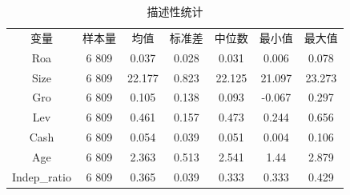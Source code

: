 \documentclass{beamer}	%
\theoremstyle{plain}
\theoremstyle{definition}
\theoremstyle{remark}
\numberwithin{equation}{section}
\begin{document}
\begin{frame}
\setcounter{table}{2}
\begin{table}[htbp]\small
	\centering
	\caption{描述性统计}
	\begin{tabular}{ccccccc}
		\toprule
		\multicolumn{1}{c}{变量} & 样本量   & 均值    & 标准差   & 中位数   & 最小值   & 最大值 \\
		Roa   & 6 809 & 0.037 & 0.028 & 0.031 & 0.006 & 0.078 \\
		Size  & 6 809 & 22.177 & 0.823 & 22.125 & 21.097 & 23.273 \\
		Gro   & 6 809 & 0.105 & 0.138 & 0.093 & -0.067 & 0.297 \\
		Lev   & 6 809 & 0.461 & 0.157 & 0.473 & 0.244 & 0.656 \\
		Cash  & 6 809 & 0.054 & 0.039 & 0.051 & 0.004 & 0.106 \\
		Age   & 6 809 & 2.363 & 0.513 & 2.541 & 1.44  & 2.879 \\
		Indep\_ratio & 6 809 & 0.365 & 0.039 & 0.333 & 0.333 & 0.429 \\
		\bottomrule    \end{tabular}%
	\label{描述性统计}%
\end{table}%
\end{frame}
\end{document}
